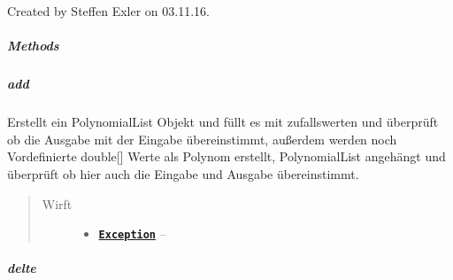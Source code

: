 \documentclass[letterpaper,10pt,ngerman]{sphinxmanual}
\begin{document}
\begin{fulllineitems}
\label{com/linuxluigi/polynomial/test/PolynomialListTest:com.linuxluigi.polynomial.test.PolynomialListTest}
Created by Steffen Exler on 03.11.16.

\end{fulllineitems}



\subparagraph{Methods}
\label{com/linuxluigi/polynomial/test/PolynomialListTest:methods}

\subparagraph{add}
\label{com/linuxluigi/polynomial/test/PolynomialListTest:add}

\begin{fulllineitems}
\label{com/linuxluigi/polynomial/test/PolynomialListTest:com.linuxluigi.polynomial.test.PolynomialListTest.add()}
Erstellt ein PolynomialList Objekt und füllt es mit zufallswerten und überprüft ob die Ausgabe mit der Eingabe übereinstimmt, außerdem werden noch Vordefinierte double{[}{]} Werte als Polynom erstellt, PolynomialList angehängt und überprüft ob hier auch die Eingabe und Ausgabe übereinstimmt.
\begin{quote}\begin{description}
\item[{Wirft}] \leavevmode\begin{itemize}
\item {} 
\href{http://docs.oracle.com/javase/8/docs/api/java/lang/Exception.html}{\textbf{\texttt{Exception}}} -- 

\end{itemize}

\end{description}\end{quote}

\end{fulllineitems}



\subparagraph{delte}
\label{com/linuxluigi/polynomial/test/PolynomialListTest:delte}
\end{document}
